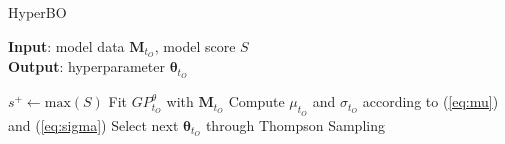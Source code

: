 \begin{algorithm}
	\caption{HyperBO}
	\label{alg:HyperBO}
	\textbf{Input}: model data $\boldsymbol{M}_{t_{O}}$, model score $S$\\
	\textbf{Output}: hyperparameter $\boldsymbol{\theta}_{t_{O}}$
	\begin{algorithmic}[1]
		\STATE $s^{+} \leftarrow \text{max}(S)$
		\STATE Fit $GP_{t_{O}}^{\theta}$ with $\boldsymbol{M}_{t_{O}}$
		\STATE Compute $\mu_{t_{O}}$ and $\sigma_{t_{O}}$ according to (\ref{eq:mu}) and (\ref{eq:sigma})
		\STATE Select next $\boldsymbol{\theta}_{t_{O}}$ through Thompson Sampling
	\end{algorithmic}
\end{algorithm}